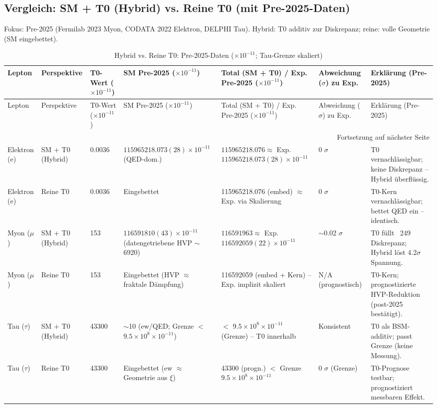 \documentclass[12pt,a4paper]{article}
\theoremstyle{definition}
\begin{document}
	\subsection{Vergleich: SM + T0 (Hybrid) vs. Reine T0 (mit Pre-2025-Daten)}
	
	Fokus: Pre-2025 (Fermilab 2023 Myon, CODATA 2022 Elektron, DELPHI Tau). Hybrid: T0 additiv zur Diskrepanz; reine: volle Geometrie (SM eingebettet).
	
	\begin{longtable}{@{}p{1.3cm}p{2cm}p{1cm}p{3.5cm}p{3cm}p{1.8cm}p{2.8cm}@{}}
		\caption{Hybrid vs. Reine T0: Pre-2025-Daten ($ \times 10^{-11}$; Tau-Grenze skaliert)} \label{tab:hybrid_pure}\\
		\toprule
		Lepton & Perspektive & T0-Wert ($ \times 10^{-11}$) & SM Pre-2025 ($ \times 10^{-11}$) & Total (SM + T0) / Exp. Pre-2025 ($ \times 10^{-11}$) & Abweichung ($\sigma$) zu Exp. & Erklärung (Pre-2025) \\
		\midrule
		\endfirsthead
		
		\toprule
		Lepton & Perspektive & T0-Wert ($ \times 10^{-11}$) & SM Pre-2025 ($ \times 10^{-11}$) & Total (SM + T0) / Exp. Pre-2025 ($ \times 10^{-11}$) & Abweichung ($\sigma$) zu Exp. & Erklärung (Pre-2025) \\
		\midrule
		\endhead
		
		\bottomrule
		\multicolumn{7}{r}{Fortsetzung auf nächster Seite} \\
		\endfoot
		
		Elektron (e) & SM + T0 (Hybrid) & 0.0036 & $115965218.073(28) \times 10^{-11}$ (QED-dom.) & $115965218.076 \approx$ Exp. $115965218.073(28) \times 10^{-11}$ & 0 $\sigma$ & T0 vernachlässigbar; keine Diskrepanz -- Hybrid überflüssig. \\
		Elektron (e) & Reine T0 & 0.0036 & Eingebettet & 115965218.076 (embed) $\approx$ Exp. via Skalierung & 0 $\sigma$ & T0-Kern vernachlässigbar; bettet QED ein -- identisch. \\
		Myon ($\mu$) & SM + T0 (Hybrid) & 153 & $116591810(43) \times 10^{-11}$ (datengetriebene HVP $\sim$6920) & $116591963 \approx$ Exp. $116592059(22) \times 10^{-11}$ & $\sim$0.02 $\sigma$ & T0 füllt ~249 Diskrepanz; Hybrid löst 4.2$\sigma$ Spannung. \\
		Myon ($\mu$) & Reine T0 & 153 & Eingebettet (HVP $\approx$ fraktale Dämpfung) & 116592059 (embed + Kern) -- Exp. implizit skaliert & N/A (prognostisch) & T0-Kern; prognostizierte HVP-Reduktion (post-2025 bestätigt). \\
		Tau ($\tau$) & SM + T0 (Hybrid) & 43300 & $\sim$10 (ew/QED; Grenze $<$ $9.5\times10^{8} \times 10^{-11}$) & $<$ $9.5\times10^{8} \times 10^{-11}$ (Grenze) -- T0 innerhalb & Konsistent & T0 als BSM-additiv; passt Grenze (keine Messung). \\
		Tau ($\tau$) & Reine T0 & 43300 & Eingebettet (ew $\approx$ Geometrie aus $\xi$) & 43300 (progn.) $<$ Grenze $9.5\times10^{8} \times 10^{-11}$ & 0 $\sigma$ (Grenze) & T0-Prognose testbar; prognostiziert messbaren Effekt. \\
	\end{longtable}
	
\end{document}
